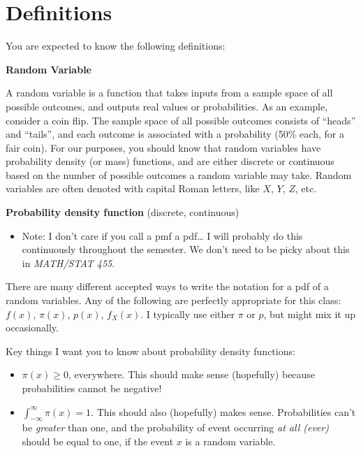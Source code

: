 \documentclass[
  letterpaper,
  DIV=11,
  numbers=noendperiod]{scrreprt}
\providecommand{\tightlist}{%
  \setlength{\itemsep}{0pt}\setlength{\parskip}{0pt}}\usepackage{longtable,booktabs,array}
\begin{document}
\hypertarget{definitions}{%
\section{Definitions}\label{definitions}}

You are expected to know the following definitions:

\textbf{Random Variable}

A random variable is a function that takes inputs from a sample space of
all possible outcomes, and outputs real values or probabilities. As an
example, consider a coin flip. The sample space of all possible outcomes
consists of ``heads'' and ``tails'', and each outcome is associated with
a probability (50\% each, for a fair coin). For our purposes, you should
know that random variables have probability density (or mass) functions,
and are either discrete or continuous based on the number of possible
outcomes a random variable may take. Random variables are often denoted
with capital Roman letters, like \(X\), \(Y\), \(Z\), etc.

\textbf{Probability density function} (discrete, continuous)

\begin{itemize}
\tightlist
\item
  Note: I don't care if you call a pmf a pdf\ldots{} I will probably do
  this continuously throughout the semester. We don't need to be picky
  about this in \emph{MATH/STAT 455}.
\end{itemize}

There are many different accepted ways to write the notation for a pdf
of a random variables. Any of the following are perfectly appropriate
for this class: \(f(x)\), \(\pi(x)\), \(p(x)\), \(f_X(x)\). I typically
use either \(\pi\) or \(p\), but might mix it up occasionally.

Key things I want you to know about probability density functions:

\begin{itemize}
\item
  \(\pi(x) \geq 0\), everywhere. This should make sense (hopefully)
  because probabilities cannot be negative!
\item
  \(\int_{-\infty}^\infty \pi(x) = 1\). This should also (hopefully)
  makes sense. Probabilities can't be \emph{greater} than one, and the
  probability of event occurring \emph{at all (ever)} should be equal to
  one, if the event \(x\) is a random variable.
\end{itemize}
\end{document}
